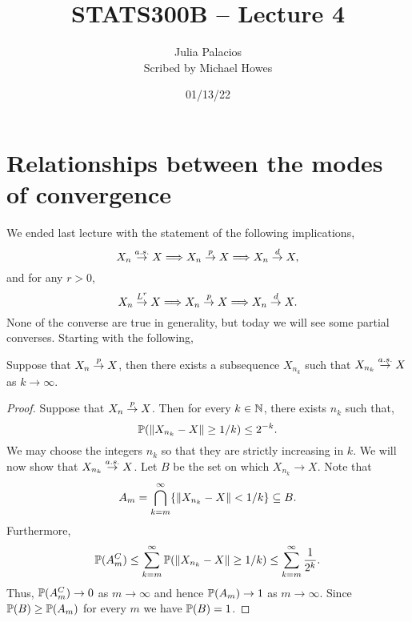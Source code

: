 




\title{STATS300B -- Lecture 4}
\author{Julia Palacios\\ Scribed by Michael Howes}
\date{01/13/22}

\pagestyle{fancy}
\fancyhf{}


\maketitle
\tableofcontents
\section{Relationships between the modes of convergence}
We ended last lecture with the statement of the following implications,
\[X_n \stackrel{a.s.}{\to} X \Longrightarrow X_n \stackrel{p}{\to} X \Longrightarrow X_n \stackrel{d}{\to} X, \]
and for any $r>0$,
\[X_n \stackrel{L^{r}}{\to} X \Longrightarrow X_n \stackrel{p}{\to} X \Longrightarrow X_n \stackrel{d}{\to} X. \]
None of the converse are true in generality, but today we will see some partial converses. Starting with the following,
\begin{proposition}
    Suppose that $X_n \stackrel{p}{\to} X$, then there exists a subsequence $X_{n_k}$ such that $X_{n_k} \stackrel{a.s.}{\to} X$ as $k \to \infty$.
\end{proposition}
\begin{proof}
    Suppose that $X_n \stackrel{p}{\to} X$. Then for every $k \in{{\mathbb N}}$, there exists $n_k$ such that,
    \[{\mathbb{P}}(\left\|X_{n_k} -X\right\|\ge 1/k) \le 2^{-k}. \]
    We may choose the integers $n_k$ so that they are strictly increasing in $k$. We will now show that $X_{n_k} \stackrel{a.s.}{\to} X$. Let $B$ be the set on which $X_{n_k} \to X$. Note that 
    \[A_m = \bigcap_{k=m}^\infty \{\left\|X_{n_k}-X\right\| < 1/k\} \subseteq B. \]
    Furthermore,
    \[{\mathbb{P}}(A_m^C) \le \sum_{k=m}^\infty {\mathbb{P}}(\left\|X_{n_k}-X\right\| \ge 1/k) \le \sum_{k=m}^\infty \frac{1}{2^k}.\]
    Thus, ${\mathbb{P}}(A_m^C) \to 0$ as $m \to \infty$ and hence ${\mathbb{P}}(A_m) \to 1$ as $m \to \infty$. Since ${\mathbb{P}}(B) \ge {\mathbb{P}}(A_m)$ for every $m$ we have ${\mathbb{P}}(B)=1$. 
\end{proof}
